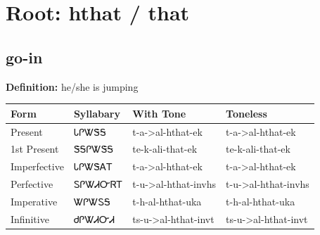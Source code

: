\documentclass{article}%
\begin{document}
%
\normalsize%
\section*{Root: hthat / that}%
\subsection*{go-in}%
\textbf{Definition: }%
he/she is jumping%
\\[0.5em]%
\begin{tabular}{|l|l|l|l|}%
\hline%
\textbf{Form}&\textbf{Syllabary}&\textbf{With Tone}&\textbf{Toneless}\\%
\hline%
Present&ᏓᎵᏔᏕᎦ&t{-}a{-}>al{-}hthat{-}ek&t{-}a{-}>al{-}hthat{-}ek\\%
1st Present&ᏕᎦᎵᏔᏕᎦ&te{-}k{-}ali{-}that{-}ek&te{-}k{-}ali{-}that{-}ek\\%
Imperfective&ᏓᎵᏔᏕᎪᎢ&t{-}a{-}>al{-}hthat{-}ek&t{-}a{-}>al{-}hthat{-}ek\\%
Perfective&ᏚᎵᏔᏗᏅᏒᎢ&t{-}u{-}>al{-}hthat{-}invhs&t{-}u{-}>al{-}hthat{-}invhs\\%
Imperative&ᏔᎵᏔᏚᎦ&t{-}h{-}al{-}hthat{-}uka&t{-}h{-}al{-}hthat{-}uka\\%
Infinitive&ᏧᎵᏔᏗᏅᏗ&ts{-}u{-}>al{-}hthat{-}invt&ts{-}u{-}>al{-}hthat{-}invt\\%
\hline%
\end{tabular}%
\\[1em]%
\end{document}
